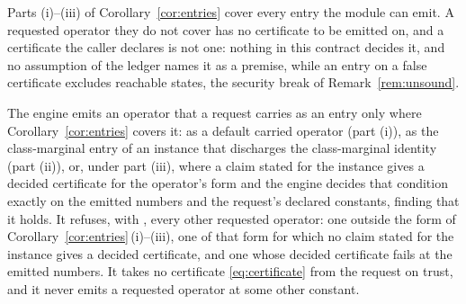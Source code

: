 
Parts (i)--(iii) of Corollary~\ref{cor:entries} cover every entry the module
can emit. A requested operator they do not cover has no certificate to be
emitted on, and a certificate the caller declares is not one: nothing in this
contract decides it, and no assumption of the ledger names it as a premise,
while an entry on a false certificate excludes reachable states, the
security break of Remark~\ref{rem:unsound}.

\begin{requirement}\label{req:uncertified-operator-refused}
The engine emits an operator that a request carries as an entry only where
Corollary~\ref{cor:entries} covers it: as a default carried operator (part
(i)), as the class-marginal entry of an instance that discharges the
class-marginal identity (part (ii)), or, under part (iii), where a claim
stated for the instance gives a decided certificate for the operator's form
and the engine decides that condition exactly on the emitted numbers and the
request's declared constants, finding that it holds. It refuses, with
, every other requested operator: one
outside the form of Corollary~\ref{cor:entries}\,(i)--(iii), one of that form
for which no claim stated for the instance gives a decided certificate, and
one whose decided certificate fails at the emitted numbers. It takes no
certificate \eqref{eq:certificate} from the request on trust, and it never
emits a requested operator at some other constant.
\end{requirement}
